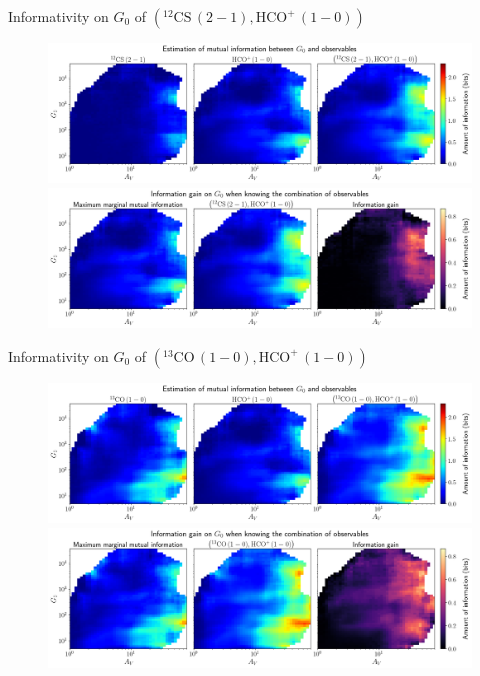 \documentclass{beamer}
\begin{document}
\begin{frame}{Informativity on $G_0$ of $\left(\mathrm{^{12}CS\,(2-1)},\mathrm{HCO^+\,(1-0)}\right)$}
    \begin{figure}
        \centering
        \includegraphics[width=0.95\linewidth]{../mi/g0__12cs21_hcop10_mi.png}
        \vfill
        \includegraphics[width=0.95\linewidth]{../mi/g0__12cs21_hcop10_mi_gain.png}
    \end{figure}
\end{frame}

\begin{frame}{Informativity on $G_0$ of $\left(\mathrm{^{13}CO\,(1-0)},\mathrm{HCO^+\,(1-0)}\right)$}
    \begin{figure}
        \centering
        \includegraphics[width=0.95\linewidth]{../mi/g0__13co10_hcop10_mi.png}
        \vfill
        \includegraphics[width=0.95\linewidth]{../mi/g0__13co10_hcop10_mi_gain.png}
    \end{figure}
\end{frame}
\end{document}
